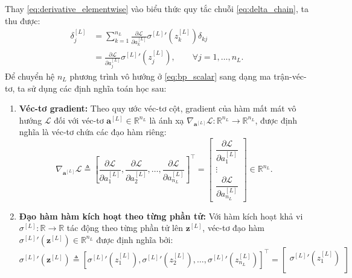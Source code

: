 Thay \eqref{eq:derivative_elementwise} vào biểu thức quy tắc chuỗi \eqref{eq:delta_chain}, ta thu được:
\begin{equation}
\begin{aligned}
    \delta_j^{[L]} &= \sum_{k=1}^{n_L} \frac{\partial\mathcal{L}}{\partial a_k^{[L]}} {\sigma^{[L]}}'\!\left(z_k^{[L]}\right) \delta_{kj} \\[6pt]
    &= \frac{\partial\mathcal{L}}{\partial a_j^{[L]}} {\sigma^{[L]}}'\!\left(z_j^{[L]}\right), \qquad \forall j = 1, \dots, n_L.
\end{aligned}
\label{eq:bp_scalar}
\end{equation}
Để chuyển hệ $n_L$ phương trình vô hướng ở \eqref{eq:bp_scalar} sang dạng ma trận-véc-tơ, ta sử dụng các định nghĩa toán học sau:
\begin{enumerate}
    \item \textbf{Véc-tơ gradient:} Theo quy ước véc-tơ cột, gradient của hàm mất mát vô hướng $\mathcal{L}$ đối với véc-tơ $\mathbf{a}^{[L]} \in \mathbb{R}^{n_L}$ là ánh xạ $\nabla_{\mathbf{a}^{[L]}}\mathcal{L}: \mathbb{R}^{n_L} \to \mathbb{R}^{n_L}$, được định nghĩa là véc-tơ chứa các đạo hàm riêng:
    \begin{equation}
    \nabla_{\mathbf{a}^{[L]}}\mathcal{L} \triangleq 
    \left[ \frac{\partial\mathcal{L}}{\partial a_1^{[L]}}, \frac{\partial\mathcal{L}}{\partial a_2^{[L]}}, \dots, \frac{\partial\mathcal{L}}{\partial a_{n_L}^{[L]}} \right]^\top =
    \begin{bmatrix} 
    \dfrac{\partial\mathcal{L}}{\partial a_1^{[L]}} \\[6pt] 
    \vdots \\ 
    \dfrac{\partial\mathcal{L}}{\partial a_{n_L}^{[L]}} 
    \end{bmatrix} \in \mathbb{R}^{n_L}.
    \end{equation}
    \item \textbf{Đạo hàm hàm kích hoạt theo từng phần tử:} Với hàm kích hoạt khả vi $\sigma^{[L]}: \mathbb{R} \to \mathbb{R}$ tác động theo từng phần tử lên $\mathbf{z}^{[L]}$, véc-tơ đạo hàm ${\sigma^{[L]}}'\!\left(\mathbf{z}^{[L]}\right) \in \mathbb{R}^{n_L}$ được định nghĩa bởi:
    \begin{equation}
    {\sigma^{[L]}}'\!\left(\mathbf{z}^{[L]}\right) \triangleq 
    \left[ {\sigma^{[L]}}'\!\left(z_1^{[L]}\right), {\sigma^{[L]}}'\!\left(z_2^{[L]}\right), \dots, {\sigma^{[L]}}'\!\left(z_{n_L}^{[L]}\right) \right]^\top =
    \begin{bmatrix} 
    {\sigma^{[L]}}'\!\left(z_1^{[L]}\right) \\[6pt] 

\end{bmatrix}
\end{equation}
\end{enumerate}
